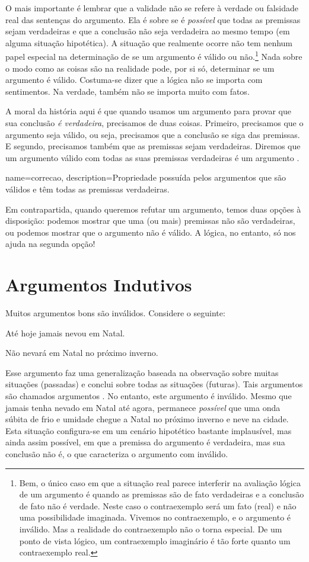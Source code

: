 O mais importante é lembrar que a validade não se refere à verdade ou falsidade real das sentenças do argumento.
Ela é sobre se é \emph{possível} que todas as premissas sejam verdadeiras e que a conclusão não seja verdadeira ao mesmo tempo (em alguma situação hipotética).
A situação que realmente ocorre não tem nenhum papel especial na determinação de se um argumento é válido ou não.\footnote{Bem, o único caso em que a situação real parece interferir na avaliação lógica de um argumento é quando as premissas são de fato verdadeiras e a conclusão de fato não é verdade.
Neste caso o contraexemplo será um fato (real) e não uma possibilidade imaginada.
Vivemos no contraexemplo, e o argumento é inválido.
Mas a realidade do contraexemplo não o torna especial.
De um ponto de vista lógico, um contraexemplo imaginário é tão forte quanto um contraexemplo real.}
Nada sobre o modo como as coisas são na realidade pode, por si só, determinar se um argumento é válido.
Costuma-se dizer que a lógica não se importa com sentimentos.
Na verdade, também não se importa muito com fatos.

A moral da história aqui é que quando usamos um argumento para provar que sua conclusão \emph{é verdadeira}, precisamos de duas coisas.
Primeiro, precisamos que o argumento seja válido, ou seja, precisamos que a conclusão se siga das premissas.
E segundo, precisamos também que as premissas sejam verdadeiras.
Diremos que um argumento válido com todas as suas premissas verdadeiras é um argumento .


{
name=correcao,
description={Propriedade possuída pelos argumentos que são válidos e têm todas as premissas verdadeiras.}
}

Em contrapartida, quando queremos refutar um argumento, temos duas opções à disposição: podemos mostrar que uma (ou mais) premissas não são verdadeiras, ou podemos mostrar que o argumento não é válido.
A lógica, no entanto, só nos ajuda na segunda opção!


\section{Argumentos Indutivos}

Muitos argumentos bons são inválidos. Considere o seguinte:
	\begin{earg}
		\item[] Até hoje jamais nevou em Natal.
	\item[\therefore] Não nevará em Natal no próximo inverno.
\end{earg}
Esse argumento faz uma generalização baseada na observação sobre muitas situações (passadas) e conclui sobre todas as situações (futuras).
Tais argumentos são chamados argumentos .
No entanto, este argumento é inválido.
Mesmo que jamais tenha nevado em Natal até agora, permanece \emph{possível} que 
uma onda súbita de frio e umidade chegue a Natal no próximo inverno e neve na cidade.
Esta situação configura-se em um cenário hipotético bastante implausível, mas ainda assim possível, em que a premissa do argumento é verdadeira, mas sua conclusão não é, o que caracteriza o argumento com inválido.

